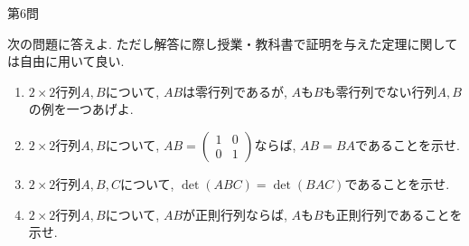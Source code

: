 \documentclass[dvipdfmx,a4paper,11pt]{article}
\theoremstyle{definition}
\begin{document}
\newpage 

 \vspace{11pt}
{\Large 第6問}  
 
 次の問題に答えよ. ただし解答に際し授業・教科書で証明を与えた定理に関しては自由に用いて良い. 
   
   
 \begin{enumerate}
\renewcommand{\labelenumi}{(\arabic{enumi}).}
 \setlength{\parskip}{0cm} %
  \setlength{\itemsep}{0cm}
    \item $2\times 2$行列$A, B$について, $AB$は零行列であるが, $A$も$B$も零行列でない行列$A,B$の例を一つあげよ. 
 \item $2\times 2$行列$A, B$について, $AB=\begin{pmatrix}  1&  0 \\  0 &1  \end{pmatrix}$ならば, $AB=BA$であることを示せ.
 \item $2\times 2$行列$A, B, C$について, $\det(ABC) = \det(BAC)$であることを示せ.
   \item $2\times 2$行列$A, B$について, $AB$が正則行列ならば, $A$も$B$も正則行列であることを示せ.
 \end{enumerate} 
\end{document}
